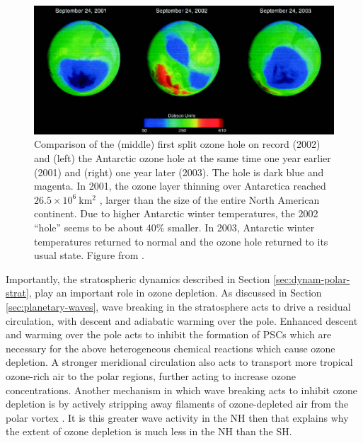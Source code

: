 \begin{figure}
 \centering
 \noindent\includegraphics[width=\textwidth]{figures/chapter-intro/2002_SSW.png}
 \caption[]{Comparison of the (middle) first split ozone hole on record (2002)
   and (left) the Antarctic ozone hole at the same time one year earlier (2001)
   and (right) one year later (2003). The hole is dark blue and magenta. In
   2001, the ozone layer thinning over Antarctica reached
   $26.5 \times 10^6~\mathrm{km^2}$ , larger than the size of the entire North
   American continent. Due to higher Antarctic winter temperatures, the 2002
   ``hole'' seems to be about 40\% smaller. In 2003, Antarctic winter
   temperatures returned to normal and the ozone hole returned to its usual
   state. Figure from \citet{Shepherd2005}.}
 \label{fig:2002_SSW}
\end{figure}

Importantly, the stratospheric dynamics described in Section
\ref{sec:dynam-polar-strat}, play an important role in ozone depletion. As
discussed in Section \ref{sec:planetary-waves}, wave breaking in the
stratosphere acts to drive a residual circulation, with descent and adiabatic
warming over the pole. Enhanced descent and warming over the pole acts to
inhibit the formation of PSCs which are necessary for the above heterogeneous
chemical reactions which cause ozone depletion. A stronger meridional
circulation also acts to transport more tropical ozone-rich air to the polar
regions, further acting to increase ozone concentrations. Another mechanism in
which wave breaking acts to inhibit ozone depletion is by actively stripping
away filaments of ozone-depleted air from the polar vortex \citep{Waugh1994}. It
is this greater wave activity in the NH then that explains why the extent of
ozone depletion is much less in the NH than the SH.


